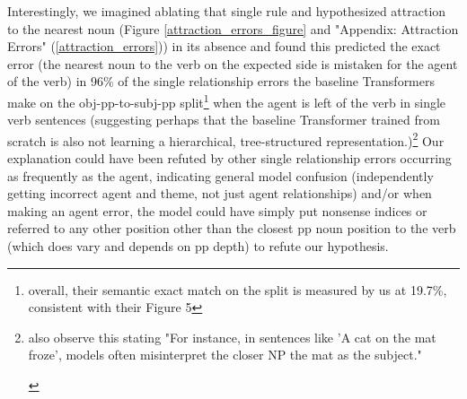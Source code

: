\documentclass[11pt]{article}
\begin{document}
Interestingly, we imagined ablating that single rule and hypothesized attraction to the nearest noun (Figure \ref{attraction_errors_figure} and "Appendix: Attraction Errors" (\ref{attraction_errors})) in its absence and found this predicted the exact error (the nearest noun to the verb on the expected side is mistaken for the agent of the verb) 
in 96\% of the single relationship errors the \cite{Wu2023} baseline Transformers make on the obj-pp-to-subj-pp split\footnote{overall, their semantic exact match on the split is measured by us at 19.7\%, consistent with their Figure 5} when the agent is left of the verb in single verb sentences (suggesting perhaps that the baseline \cite{Wu2023} Transformer trained from scratch is also not learning a hierarchical, tree-structured representation.)\footnote{\begin{footnotesize}\cite{li2023slogstructuralgeneralizationbenchmark} also observe this stating "For instance, in sentences like 'A cat on the mat froze', models often misinterpret the closer NP the mat as the subject."\end{footnotesize}}
Our explanation could have been refuted by other single relationship errors occurring as frequently as the agent, indicating general model confusion (independently getting incorrect agent and theme, not just agent relationships) and/or when making an agent error, the model could have simply put nonsense indices or referred to any other position other than the closest pp noun position to the verb (which does vary and depends on pp depth) to refute our hypothesis.
\end{document}
